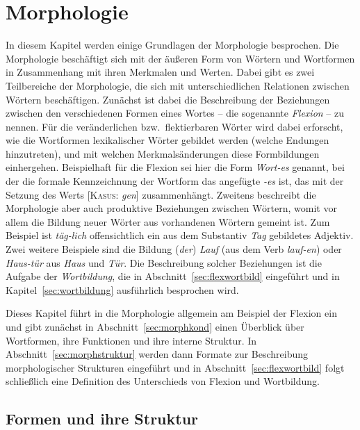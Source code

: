 \chapter{Morphologie}

\label{sec:morphologie}

In diesem Kapitel werden einige Grundlagen der Morphologie besprochen.
Die Morphologie beschäftigt sich mit der äußeren Form von Wörtern und Wortformen in Zusammenhang mit ihren Merkmalen und Werten.
Dabei gibt es zwei Teilbereiche der Morphologie, die sich mit unterschiedlichen Relationen zwischen Wörtern beschäftigen.
Zunächst ist dabei die Beschreibung der Beziehungen zwischen den verschiedenen Formen eines Wortes -- die sogenannte \textit{Flexion} -- zu nennen.
Für die veränderlichen bzw.\ flektierbaren Wörter wird dabei erforscht, wie die Wortformen lexikalischer Wörter gebildet werden (\zB welche Endungen hinzutreten), und mit welchen Merkmalsänderungen diese Formbildungen einhergehen.
Beispielhaft für die Flexion sei hier die Form \textit{Wort-es} genannt, bei der die formale Kennzeichnung der Wortform das angefügte \textit{-es} ist, das mit der Setzung des Werts [\textsc{Kasus}: \textit{gen}] zusammenhängt.
Zweitens beschreibt die Morphologie aber auch produktive Beziehungen zwischen Wörtern, womit vor allem die Bildung neuer Wörter aus vorhandenen Wörtern gemeint ist.
Zum Beispiel ist \textit{täg-lich} offensichtlich ein aus dem Substantiv \textit{Tag} gebildetes Adjektiv.
Zwei weitere Beispiele sind die Bildung (\textit{der}) \textit{Lauf} (aus dem Verb \textit{lauf-en}) oder \textit{Haus-tür} aus \textit{Haus} und \textit{Tür}.
Die Beschreibung solcher Beziehungen ist die Aufgabe der \textit{Wortbildung}, die in Abschnitt~\ref{sec:flexwortbild} eingeführt und in Kapitel~\ref{sec:wortbildung} ausführlich besprochen wird.

Dieses Kapitel führt in die Morphologie allgemein am Beispiel der Flexion ein und gibt zunächst in Abschnitt~\ref{sec:morphkond} einen Überblick über Wortformen, ihre Funktionen und ihre interne Struktur.
In Abschnitt~\ref{sec:morphstruktur} werden dann Formate zur Beschreibung morphologischer Strukturen eingeführt und in Abschnitt~\ref{sec:flexwortbild} folgt schließlich eine Definition des Unterschieds von Flexion und Wortbildung.

\section{Formen und ihre Struktur}

